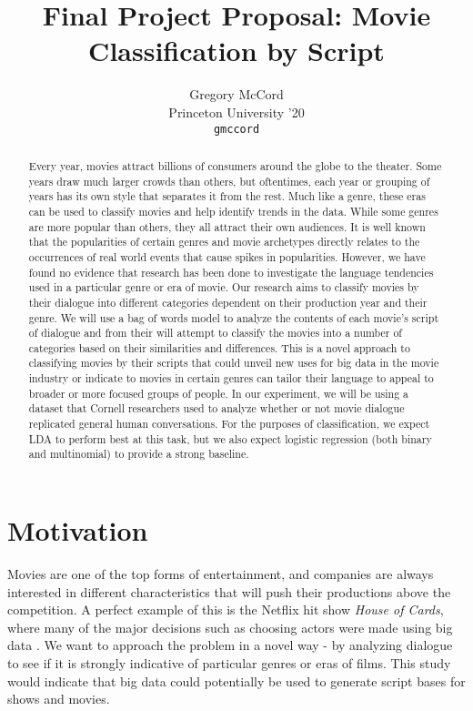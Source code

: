 \documentclass{article} %
\title{Final Project Proposal: Movie Classification by Script}
\author{
Gregory McCord\\
Princeton University '20\\
\texttt{gmccord} \\
}
\begin{document}
\maketitle

\begin{abstract}

Every year, movies attract billions of consumers around the globe to the theater. Some years draw much larger crowds than others, but oftentimes, each year or grouping of years has its own style that separates it from the rest. Much like a genre, these eras can be used to classify movies and help identify trends in the data. While some genres are more popular than others, they all attract their own audiences. It is well known that the popularities of certain genres and movie archetypes directly relates to the occurrences of real world events that cause spikes in popularities. However, we have found no evidence that research has been done to investigate the language tendencies used in a particular genre or era of movie. Our research aims to classify movies by their dialogue into different categories dependent on their production year and their genre. We will use a bag of words model to analyze the contents of each movie's script of dialogue and from their will attempt to classify the movies into a number of categories based on their similarities and differences. This is a novel approach to classifying movies by their scripts that could unveil new uses for big data in the movie industry or indicate to movies in certain genres can tailor their language to appeal to broader or more focused groups of people. In our experiment, we will be using a dataset that Cornell researchers used to analyze whether or not movie dialogue replicated general human conversations. For the purposes of classification, we expect LDA to perform best at this task, but we also expect logistic regression (both binary and multinomial) to provide a strong baseline.

\end{abstract}

\section{Motivation}

Movies are one of the top forms of entertainment, and companies are always interested in different characteristics that will push their productions above the competition. A perfect example of this is the Netflix hit show \textit{House of Cards}, where many of the major decisions such as choosing actors were made using big data \cite{hoc}. We want to approach the problem in a novel way - by analyzing dialogue to see if it is strongly indicative of particular genres or eras of films. This study would indicate that big data could potentially be used to generate script bases for shows and movies.
\end{document}
